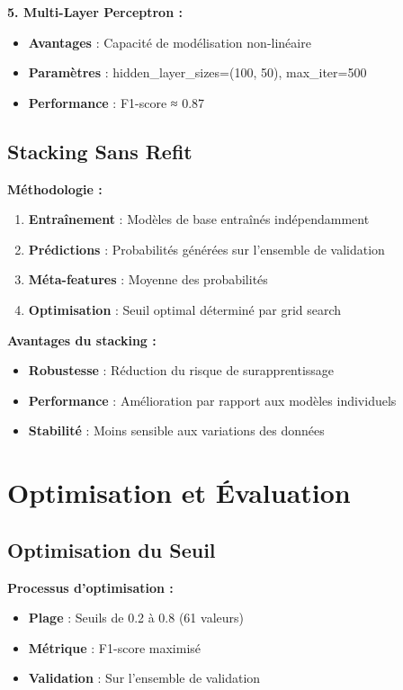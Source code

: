 \documentclass[12pt,a4paper]{article}
\begin{document}
\textbf{5. Multi-Layer Perceptron :}
\begin{itemize}
    \item \textbf{Avantages} : Capacité de modélisation non-linéaire
    \item \textbf{Paramètres} : hidden\_layer\_sizes=(100, 50), max\_iter=500
    \item \textbf{Performance} : F1-score ≈ 0.87
\end{itemize}

\subsection{Stacking Sans Refit}

\textbf{Méthodologie :}
\begin{enumerate}
    \item \textbf{Entraînement} : Modèles de base entraînés indépendamment
    \item \textbf{Prédictions} : Probabilités générées sur l'ensemble de validation
    \item \textbf{Méta-features} : Moyenne des probabilités
    \item \textbf{Optimisation} : Seuil optimal déterminé par grid search
\end{enumerate}

\textbf{Avantages du stacking :}
\begin{itemize}
    \item \textbf{Robustesse} : Réduction du risque de surapprentissage
    \item \textbf{Performance} : Amélioration par rapport aux modèles individuels
    \item \textbf{Stabilité} : Moins sensible aux variations des données
\end{itemize}

\section{Optimisation et Évaluation}

\subsection{Optimisation du Seuil}

\textbf{Processus d'optimisation :}
\begin{itemize}
    \item \textbf{Plage} : Seuils de 0.2 à 0.8 (61 valeurs)
    \item \textbf{Métrique} : F1-score maximisé
    \item \textbf{Validation} : Sur l'ensemble de validation
\end{itemize}
\end{document}

